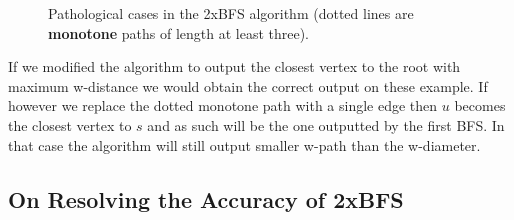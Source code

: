 \begin{figure}[h]
    \qquad
    \caption{Pathological cases in the 2xBFS algorithm (dotted lines are \textbf{monotone} paths of length at least three).}%
    \label{fig:path-cases}%
\end{figure}

If we modified the algorithm to output the closest vertex to the root with maximum w-distance we would obtain the correct output on these example. If however we replace the dotted monotone path with a single edge then $u$ becomes the closest vertex to $s$ and as such will be the one outputted by the first BFS. In that case the algorithm will still output smaller w-path than the w-diameter.


\subsection{On Resolving the Accuracy of 2xBFS}



